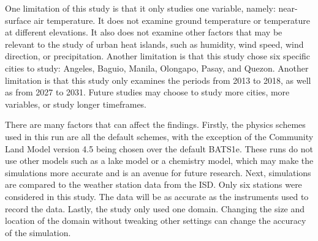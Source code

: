 	One limitation of this study is that it only studies one variable, namely: near-surface air temperature.
	It does not examine ground temperature or temperature at different elevations.
	It also does not examine other factors that may be relevant to the study of urban heat islands, such as humidity, wind speed, wind direction, or precipitation. 
	Another limitation is that this study chose six specific cities to study: Angeles, Baguio, Manila, Olongapo, Pasay, and Quezon.
	Another limitation is that this study only examines the periods from 2013 to 2018, as well as from 2027 to 2031.
	Future studies may choose to study more cities, more variables, or study longer timeframes.
	
	There are many factors that can affect the findings. 
	Firstly, the physics schemes used in this run are all the default schemes, with the exception of the Community Land Model version 4.5 being chosen over the default BATS1e. 
	These runs do not use other models such as a lake model or a chemistry model, which may make the simulations more accurate and is an avenue for future research.
	Next, simulations are compared to the weather station data from the ISD.
	Only six stations were considered in this study.
	The data will be as accurate as the instruments used to record the data.
	Lastly, the study only used one domain.
	Changing the size and location of the domain without tweaking other settings can change the accuracy of the simulation.